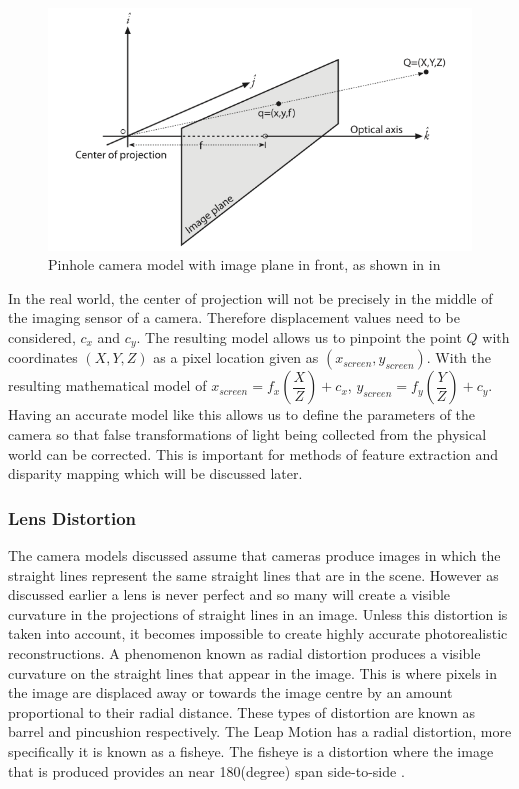 \documentclass[11pt,oneside]{report}
\begin{document}
				\begin{figure}[!ht]
				\begin{center}
					\includegraphics[scale=0.5]{pinhole2}
					\caption{Pinhole camera model with image plane in front, as shown in in \protect{} {\label{pinhole2}}}
				\end{center}
				\end{figure}
				In the real world, the center of projection will not be precisely in the middle of the imaging sensor of a camera.
				Therefore displacement values need to be considered, $c_{x}$ and $c_{y}$.
				The resulting model allows us to pinpoint the point $Q$ with coordinates $(X,Y,Z)$ as a pixel location given as $(x_{screen}, y_{screen})$.
				With the resulting mathematical model of $x_{screen}=f_{x}\left(\dfrac{X}{Z}\right)+c_{x}$, $y_{screen}=f_{y}\left(\dfrac{Y}{Z}\right)+c_{y}$.
				Having an accurate model like this allows us to define the parameters of the camera so that false transformations of light being collected from the physical world can be corrected.
				This is important for methods of feature extraction and disparity mapping which will be discussed later.
				\subsubsection{Lens Distortion}
					The camera models discussed assume that cameras produce images in which the straight lines represent the same straight lines that are in the scene.
					However as discussed earlier a lens is never perfect and so many will create a visible curvature in the projections of straight lines in an image.
					Unless this distortion is taken into account, it becomes impossible to create highly accurate photorealistic reconstructions.
					A phenomenon known as radial distortion produces a visible curvature on the straight lines that appear in the image.
					This is where pixels in the image are displaced away or towards the image centre by an amount proportional to their radial distance.
					These types of distortion are known as barrel and pincushion respectively.
					The Leap Motion has a radial distortion, more specifically it is known as a fisheye.
					The fisheye is a distortion where the image that is produced provides an near 180(degree) span side-to-side \cite{book:sam}.
\end{document}
